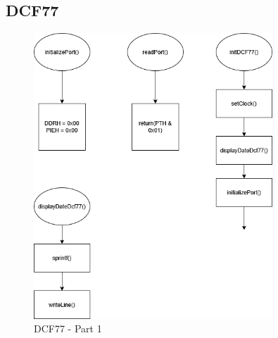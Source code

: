 \documentclass[a4paper,12pt]{article}
\begin{document}

\subsection{DCF77}

\begin{figure}[H]
    \centering
    \includegraphics[width=0.8\textwidth]{diagrams/5.dcf771.png}
    \caption{DCF77 - Part 1}
    \label{fig:DCF77}
\end{figure}
\end{document}
